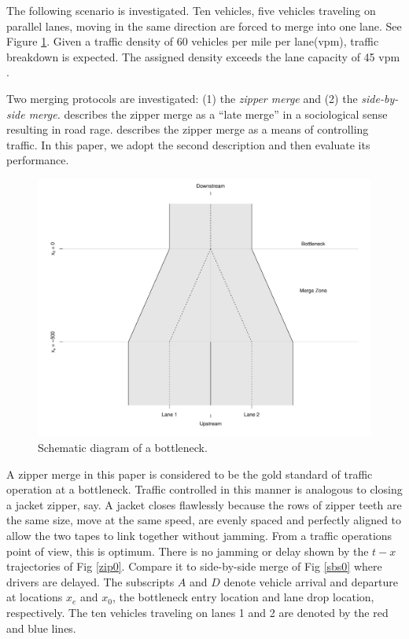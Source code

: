 \documentclass[Proceedings]{ascelike}
\begin{document}
The following scenario is investigated. Ten vehicles, five vehicles traveling on  parallel lanes, moving in the same direction are forced to merge into one lane. See Figure \ref{schematic}. Given a traffic density of 60 vehicles per mile per lane(vpm), traffic breakdown is expected.  The assigned density exceeds the lane capacity of 45 vpm \cite{HCM2000}. 

Two merging protocols are investigated: (1) the \emph{zipper merge} and (2) the \emph{side-by-side merge.}  describes the  zipper merge as a ``late merge'' in a sociological sense resulting in road rage.  describes the zipper merge as a means of controlling traffic. In this paper, we adopt the second description and then evaluate its performance. 


\begin{figure}
\centering
\includegraphics[width = 4.5in]{Rplot02.pdf}
\caption{Schematic diagram of a bottleneck.}
\label{schematic}
\end{figure}

A zipper merge in this paper is considered to be the gold standard of traffic operation at a bottleneck.  Traffic controlled  in this manner is analogous to  closing a jacket zipper, say. A jacket closes flawlessly because the rows of zipper teeth are the same size, move at the same speed, are evenly spaced and perfectly aligned to allow the two tapes to link together without jamming. From a traffic operations point of view, this is optimum. There is no jamming or delay shown by the $t-x$ trajectories of Fig \ref{zip0}. Compare it to side-by-side merge of Fig \ref{sbs0} where drivers are delayed. The subscripts $A$ and $D$ denote  vehicle arrival and departure at locations $x_e$ and $x_0$, the bottleneck entry location and lane drop location, respectively. The ten vehicles traveling on lanes 1 and 2 are denoted by the red and blue lines. 
\end{document}
